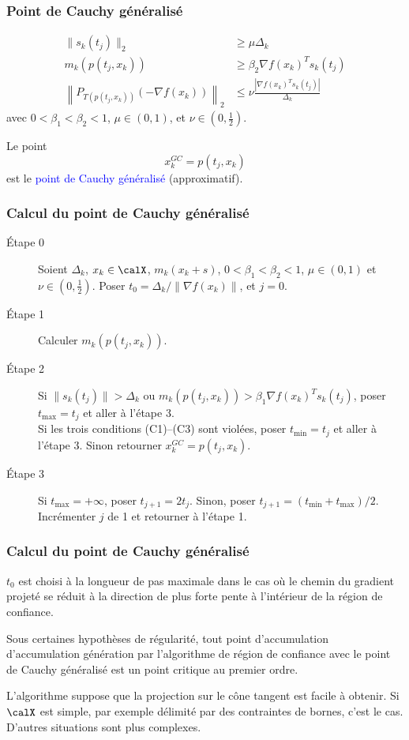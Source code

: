 \documentclass[t,aspectratio=169,usepdftitle=false]{beamer}
\def\cX{\calX}
\begin{document}
\begin{frame}
\frametitle{Point de Cauchy généralisé}

\begin{align}
\| s_k(t_j) \|_2 & \geq \mu \Delta_k \tag{C1} \\
m_k(p(t_j,x_k)) & \geq \beta_2 \nabla f(x_k)^T s_k(t_j) \tag{C2} \\
\left\| P_{T(p(t_j,x_k))}(-\nabla f(x_k)) \right\|_2 &\leq \nu \frac{ \left| \nabla f(x_k)^Ts_k(t_j) \right| }{\Delta_k} \tag{C3}
\end{align}
avec $0 < \beta_1 < \beta_2 < 1$, $\mu \in (0,1)$, et $\nu \in (0, \frac{1}{2})$.

\mbox{}

Le point
$$
x_k^{GC} = p(t_j, x_k)
$$
est le \textcolor{blue}{point de Cauchy généralisé} (approximatif).

\end{frame}

\begin{frame}
\frametitle{Calcul du point de Cauchy généralisé}

\begin{description}
	\item[Étape 0] Soient $\Delta_k$, $x_k \in \cX$, $m_k(x_k+s)$, $0 < \beta_1 < \beta_2 < 1$, $\mu \in (0,1)$ et $\nu \in (0, \frac{1}{2})$.
	Poser $t_0 = \Delta_k/\|\nabla f(x_k)\|$, et $j = 0$.
	\item[Étape 1] Calculer $m_k(p(t_j,x_k))$.
	\item[Étape 2] Si $\| s_k(t_j) \| > \Delta_k$ ou
	$m_k(p(t_j,x_k)) > \beta_1 \nabla f(x_k)^T s_k(t_j)$, poser $t_{\max} = t_j$ et aller à l'étape 3.\\
	Si les trois conditions (C1)--(C3) sont violées, poser $t_{\min} = t_j$ et aller à l'étape 3.
	Sinon retourner $x_k^{GC} = p(t_j,x_k)$.
	\item[Étape 3] Si $t_{\max} = +\infty$, poser $t_{j+1} = 2t_j$.
	Sinon, poser $t_{j+1} = \left(t_{\min}+t_{\max}\right)/2$.
	Incrémenter $j$ de 1 et retourner à l'étape 1.
\end{description}

\end{frame}

\begin{frame}
\frametitle{Calcul du point de Cauchy généralisé}

$t_0$ est choisi à la longueur de pas maximale dans le cas où le chemin du gradient projeté se réduit à la direction de plus forte pente à l'intérieur de la région de confiance.

\mbox{}

Sous certaines hypothèses de régularité, tout point d'accumulation d'accumulation génération par l'algorithme de région de confiance avec le point de Cauchy généralisé est un point critique au premier ordre.

\mbox{}

L'algorithme suppose que la projection sur le cône tangent est facile à obtenir.
Si $\cX$ est simple, par exemple délimité par des contraintes de bornes, c'est le cas. D'autres situations sont plus complexes.

\end{frame}
\end{document}
